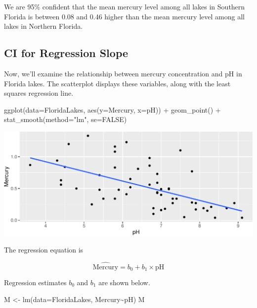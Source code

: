 \documentclass[
  letterpaper,
  DIV=11,
  numbers=noendperiod]{scrreprt}
\newenvironment{Shaded}{\begin{snugshade}}{\end{snugshade}}
\newcommand{\AttributeTok}[1]{\textcolor[rgb]{0.40,0.45,0.13}{#1}}
\newcommand{\ConstantTok}[1]{\textcolor[rgb]{0.56,0.35,0.01}{#1}}
\newcommand{\FunctionTok}[1]{\textcolor[rgb]{0.28,0.35,0.67}{#1}}
\newcommand{\NormalTok}[1]{\textcolor[rgb]{0.00,0.23,0.31}{#1}}
\newcommand{\OtherTok}[1]{\textcolor[rgb]{0.00,0.23,0.31}{#1}}
\newcommand{\SpecialCharTok}[1]{\textcolor[rgb]{0.37,0.37,0.37}{#1}}
\newcommand{\StringTok}[1]{\textcolor[rgb]{0.13,0.47,0.30}{#1}}
\begin{document}
We are 95\% confident that the mean mercury level among all lakes in
Southern Florida is between 0.08 and 0.46 higher than the mean mercury
level among all lakes in Northern Florida.

\subsection{CI for Regression Slope}\label{ci-for-regression-slope}

Now, we'll examine the relationship between mercury concentration and pH
in Florida lakes. The scatterplot displays these variables, along with
the least squares regression line.

\begin{Shaded}
\begin{Highlighting}[]
\FunctionTok{ggplot}\NormalTok{(}\AttributeTok{data=}\NormalTok{FloridaLakes, }\FunctionTok{aes}\NormalTok{(}\AttributeTok{y=}\NormalTok{Mercury, }\AttributeTok{x=}\NormalTok{pH)) }\SpecialCharTok{+} 
  \FunctionTok{geom\_point}\NormalTok{() }\SpecialCharTok{+} \FunctionTok{stat\_smooth}\NormalTok{(}\AttributeTok{method=}\StringTok{"lm"}\NormalTok{, }\AttributeTok{se=}\ConstantTok{FALSE}\NormalTok{)}
\end{Highlighting}
\end{Shaded}

\includegraphics{Ch3_files/figure-pdf/unnamed-chunk-115-1.pdf}

The regression equation is

\[
\widehat{\text{Mercury}} = b_0 + b_1\times\text{pH}
\]

Regression estimates \(b_0\) and \(b_1\) are shown below.

\begin{Shaded}
\begin{Highlighting}[]
\NormalTok{M }\OtherTok{\textless{}{-}} \FunctionTok{lm}\NormalTok{(}\AttributeTok{data=}\NormalTok{FloridaLakes, Mercury}\SpecialCharTok{\textasciitilde{}}\NormalTok{pH)}
\NormalTok{M}
\end{Highlighting}
\end{Shaded}
\end{document}

